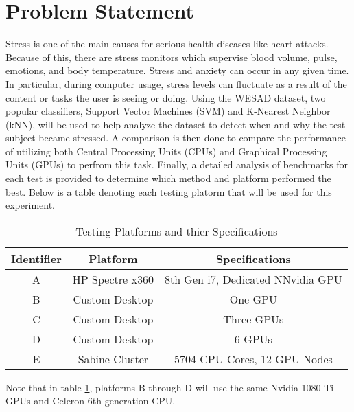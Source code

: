 \section{Problem Statement}
\label{sec:Problem-Statement}

Stress is one of the main causes for serious health diseases like heart attacks. 
Because of this, there are stress monitors which supervise  blood volume, pulse, emotions, and 
body temperature. Stress and anxiety can occur in any given time. In particular, during computer usage, stress levels 
can fluctuate as a result of the content or tasks the user is seeing or doing. Using the WESAD dataset, two popular 
classifiers, Support Vector Machines (SVM) and K-Nearest Neighbor (kNN), will be used to help analyze the dataset 
to detect when and why the test subject became stressed. 
A comparison is then done to compare the performance of utilizing both Central Processing Units (CPUs) and 
Graphical Processing Units (GPUs) to perfrom this task. 
Finally, a detailed analysis of benchmarks for each test is provided to determine which method and platform 
performed the best. Below is a table denoting each testing platorm that will be used for this experiment. 

\begin{table}[h!]
\centering
\caption{Testing Platforms and thier Specifications}
\label{table:testing-platforms}
\begin{tabular}{||c c c||} 
 \hline
 Identifier & Platform  & Specifications  	\\ [0.5ex] 
 \hline\hline
 A 	& HP Spectre x360 	 & 8th Gen i7, Dedicated NNvidia GPU 	\\ 
 B 	& Custom Desktop	 & One GPU   	\\
 C 	& Custom Desktop	 & Three GPUs	\\
 D 	& Custom Desktop	 & 6 GPUs	\\
 E 	& Sabine Cluster	 & 5704 CPU Cores, 12 GPU Nodes 	 	\\ [1ex] 
 \hline
\end{tabular}
\end{table}

Note that in table \ref{table:testing-platforms}, platforms B through D will use the same Nvidia 1080 Ti GPUs and 
Celeron 6th generation CPU.
